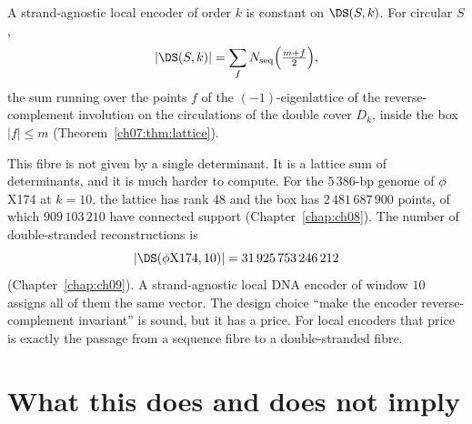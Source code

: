 \begin{proposition}\label{ch12:prop:ds}
A strand-agnostic local encoder of order $k$ is constant on $\DS(S,k)$. For circular $S$,
\[
|\DS(S,k)|=\sum_{f}N_{\mathrm{seq}}\Bigl(\tfrac{m+f}{2}\Bigr),
\]
the sum running over the points $f$ of the $(-1)$-eigenlattice of the reverse-complement involution
on the circulations of the double cover $D_k$, inside the box $|f|\le m$ (Theorem~\ref{ch07:thm:lattice}).
\end{proposition}

This fibre is not given by a single determinant. It is a lattice sum of determinants, and it is
much harder to compute. For the $5\,386$-bp genome of $\phi$X174 at $k=10$, the lattice has rank $48$
and the box has $2\,481\,687\,900$ points, of which $909\,103\,210$ have connected support (Chapter~\ref{chap:ch08}).
The number of double-stranded reconstructions is
\[
|\DS(\phi\mathrm{X}174,10)|=31\,925\,753\,246\,212
\]
(Chapter~\ref{chap:ch09}). A strand-agnostic local DNA encoder of window $10$ assigns all of them the same
vector. The design choice ``make the encoder reverse-complement invariant'' is sound, but it has a
price. For local encoders that price is exactly the passage from a sequence fibre to a
double-stranded fibre.

\section{What this does and does not imply}\label{ch12:sec:discussion}

